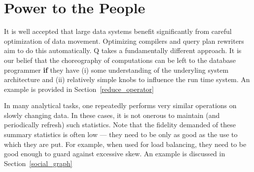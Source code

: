 \section{Power to the People}

It is well accepted that large data systems benefit significantly 
from careful optimization of data movement. Optimizing compilers and query plan
rewriters aim to do this automatically.
Q takes a fundamentally different approach. It is our belief that the
choreography of computations can be left to the database programmer {\bf if} 
they have (i) some understanding of the underyling
system architecture and (ii) relatively simple knobs to influence the run time
system.  An example is provided in Section~\ref{reduce_operator}

In many analytical tasks, one repeatedly performs very similar operations on slowly
changing data. In these cases, 
it is not onerous to maintain (and periodically refresh) such statistics. 
Note that the fidelity demanded of these summary statistics is often low ---
they need to be only as good as the use to which they are put. For example, when
used for load balancing, they need to be good enough to guard against excessive
skew.
An example is discussed in Section~\ref{social_graph}




